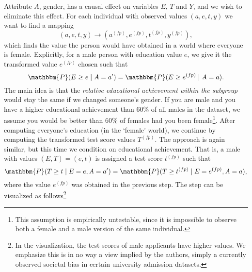 \documentclass[
  notitle]{jss}
\begin{document}
Attribute \(A\), gender, has a causal effect on variables \(E\), \(T\)
and \(Y\), and we wish to eliminate this effect. For each individual
with observed values \((a, e, t, y)\) we want to find a mapping
\[(a, e, t, y) \longrightarrow  ( {a}^{(fp)},  {e}^{(fp)},  {t}^{(fp)},  {y}^{(fp)}),\]
which finds the value the person would have obtained in a world where
everyone is female. Explicitly, for a male person with education value
\(e\), we give it the transformed value \( {e}^{(fp)}\) chosen such that
\[\mathbbm{P}(E \geq e \mid A = a') = \mathbbm{P}(E \geq  {e}^{(fp)} \mid A = a). \]
The main idea is that the
\textit{relative educational achievement within the subgroup} would stay
the same if we changed someone's gender. If you are male and you have a
higher educational achievement than 60\% of all males in the dataset, we
assume you would be better than 60\% of females had you been
female\footnote{This assumption is empirically untestable, since it is impossible to observe both a female and a male version of the same individual.}.
After computing everyone's education (in the `female' world), we
continue by computing the transformed test score values \( {T}^{(fp)}\).
The approach is again similar, but this time we condition on educational
achievement. That is, a male with values \((E, T) = (e, t)\) is assigned
a test score \( {t}^{(fp)}\) such that
\[\mathbbm{P}(T \geq t \mid E = e, A = a') = \mathbbm{P}(T \geq  {t}^{(fp)} \mid E =  {e}^{(fp)}, A = a),\]
where the value \( {e}^{(fp)}\) was obtained in the previous step. The
step can be visualized as
follows\footnote{In the visualization, the test scores of male applicants have higher values. We emphasize this is in no way a view implied by the authors, simply a currently observed societal bias in certain university admission datasets.}
\end{document}
